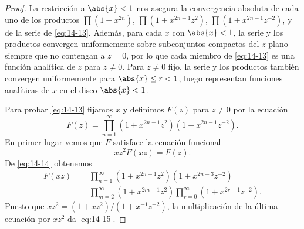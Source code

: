     \begin{proof}
        La restricción a $\abs{x}<1$ nos asegura la convergencia absoluta de cada uno de los
        productos $\prod(1-x^{2n})$, $\prod(1+x^{2n-1}z^2)$, $\prod(1+x^{2n-1}z^{-2})$, y de la
        serie de \eqref{eq:14-13}. Además, para cada $x$ con $\abs{x}<1$, la serie y los productos
        convergen uniformemente sobre subconjuntos compactos del $z$-plano siempre que no
        contengan a $z=0$, por lo que cada miembro de \eqref{eq:14-13} es una función analítica de
        $z$ para $z\neq0$. Para $z\neq0$ fijo, la serie y los productos también convergen
        uniformemente para $\abs{x}\leq r<1$, luego representan funciones analíticas de $x$ en el
        disco $\abs{x}<1$.

        Para probar \eqref{eq:14-13} fijamos $x$ y definimos $F(z)$ para $z\neq0$ por la ecuación
        \begin{equation}\label{eq:14-14}
            F(z)=\prod_{n=1}^{\infty}(1+x^{2n-1}z^2)(1+x^{2n-1}z^{-2}).
        \end{equation}
        En primer lugar vemos que $F$ satisface la ecuación funcional
        \begin{equation}\label{eq:14-15}
            xz^2F(xz)=F(z).
        \end{equation}
        De \eqref{eq:14-14} obtenemos
        \begin{align*}
            F(xz)&=\prod_{n=1}^{\infty}(1+x^{2n+1}z^2)(1+x^{2n-3}z^{-2})\\
            &=\prod_{m=2}^{\infty}(1+x^{2m-1}z^2)\prod_{r=0}^{\infty}(1+x^{2r-1}z^{-2}).
        \end{align*}
        Puesto que $xz^2=(1+xz^2)/(1+x^{-1}z^{-2})$, la multiplicación de la última ecuación por
        $xz^2$ da \eqref{eq:14-15}.


\end{proof}

